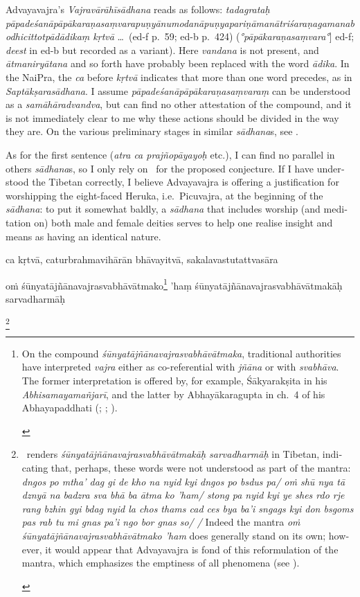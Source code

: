 \documentclass[naipra.tex]{subfiles}
\begin{document}
\begin{sanskrit}
{\begin{english}
		Advayavajra's \emph{Vajravārāhīsādhana} reads as follows: \emph{tadagrataḥ pāpadeśanāpāpākaraṇasaṃvarapuṇyānumodanāpuṇyapariṇāmanātriśaraṇagamanabodhicittotpādādikaṃ kṛtvā} \ldots\ (ed-f p.\ 59; ed-b p.\ 424) (\emph{°pāpākaraṇasaṃvara°}] ed-f; \emph{deest} in ed-b but recorded as a variant).
		Here \emph{vandana} is not present, and \emph{ātmaniryātana} and so forth have probably been replaced with the word \emph{ādika}.
		In the NaiPra, the \emph{ca} before \emph{kṛtvā} indicates that more than one word precedes, as in \emph{Saptākṣarasādhana}.
		I assume \emph{pāpadeśanāpāpākaraṇasaṃvaraṃ} can be understood as a \emph{samāhāradvandva}, but can find no other attestation of the compound, and it is not immediately clear to me why these actions should be divided in the way they are.
		On the various preliminary stages in similar \emph{sādhana}s, see \textcite[122–124]{english2002}.

		As for the first sentence (\emph{atra ca prajñopāyayoḥ} etc.), I can find no parallel in others \emph{sādhana}s, so I only rely on \TIB\ for the proposed conjecture. 
		If I have understood the Tibetan correctly, I believe Advayavajra is offering a justification for worshipping the eight-faced Heruka, i.e.\ Picuvajra, at the beginning of the \emph{sādhana}: to put it somewhat baldly, a \emph{sādhana} that includes worship (and meditation on) both male and female deities serves to help one realise insight and means as having an identical nature.
	\end{english}
}ca kṛtvā, caturbrahmavihārān bhāvayitvā, sakalavastutattvasāra \begin{mantra}oṁ śūnyatājñānavajrasvabhāvātmako\footnote{
	\begin{english}%
		On the compound \emph{śūnyatājñānavajrasvabhāvātmaka}, traditional authorities have interpreted \emph{vajra} either as co-referential with \emph{jñāna} or with \emph{svabhāva}.	
		The former interpretation is offered by, for example, Śākyarakṣita in his \emph{Abhisamayamañjarī}, and the latter by Abhayākaragupta in ch.\ 4 of his Abhayapaddhati (\cite[292]{isaacson2007}; \cite[140, 234]{yang2014}; \cite[239–40 n.\ 273, n.\ 277]{english2002}).
	\end{english}
} 'haṃ śūnyatājñānavajrasvabhāvātmakāḥ sarvadharmāḥ\end{mantra}\footnote{
	\begin{english}%
		\TIB\ renders \emph{śūnyatājñānavajrasvabhāvātmakāḥ sarvadharmāḥ} in Tibetan, indicating that, perhaps, these words were not understood as part of the mantra: \emph{dngos po mtha' dag gi de kho na nyid kyi dngos po bsdus pa/ oṁ shū nya tā dznyā na badzra sva bhā ba ātma ko 'ham/ stong pa nyid kyi ye shes rdo rje rang bzhin gyi bdag nyid la chos thams cad ces bya ba'i sngags kyi don bsgoms pas rab tu mi gnas pa'i ngo bor gnas so/ /}
		Indeed the mantra \emph{oṁ śūnyatājñānavajrasvabhāvātmako 'ham} does generally stand on its own; however, it would appear that Advayavajra is fond of this reformulation of the mantra, which emphasizes the emptiness of all phenomena (see \cite[128]{english2002}).


\end{english}}
\end{sanskrit}
\end{document}
